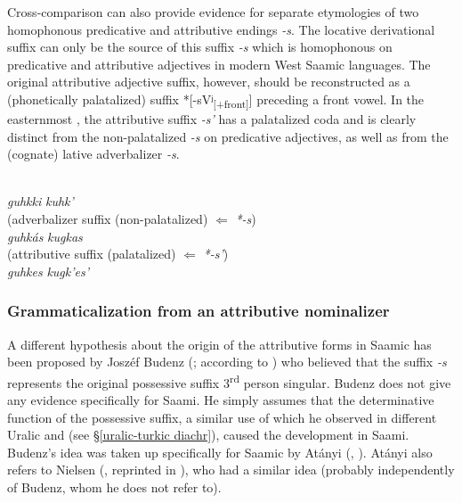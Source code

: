 {Cross-comparison can also provide evidence for separate etymologies of two homophonous predicative and attributive endings \textit{-s}. The locative derivational suffix can only be the source of this suffix \textit{-s} which is homophonous on predicative and attributive adjectives in modern West Saamic languages. The original attributive adjective suffix, however, should be reconstructed as a (phonetically palatalized) suffix *[-sVʲ\textsubscript{[+front]}] preceding a front vowel. In the easternmost , the attributive suffix \textit{-s'} has a palatalized coda and is clearly distinct from the non-palatalized \textit{-s} on predicative adjectives, as well as from the (cognate) lative adverbalizer \textit{-s}.
\begin{exe}
\settowidth{}
\ex 
\begin{xlist}
\\
	\textit{guhkki}	
	\textit{kuhk'}	
\\
	{\upshape (adverbalizer suffix (non-palatalized) $\Leftarrow$ \textit{*-s})}\\
	\textit{guhkás}	
	\textit{kugkas}	
\\
	{\upshape (attributive suffix (palatalized) $\Leftarrow$ \textit{*-s'})}\\
	\textit{guhkes}	
	\textit{kugk'es'}	
\end{xlist} 	
\end{exe}

\subsubsection{Grammaticalization from an attributive nominalizer}
A different hypothesis about the origin of the attributive forms in Saamic has been proposed by Joszéf Budenz (\citeyear{budenz1870}; according to \citealt{atanyi1942,atanyi1943}) who believed that the suffix \textit{-s} represents the original possessive suffix 3\textsuperscript{rd} person singular. Budenz does not give any evidence specifically for Saami. He simply assumes that the determinative function of the possessive suffix, a similar use of which he observed in different Uralic and  (see \S\ref{uralic-turkic diachr}), caused the development in Saami. Budenz's idea was taken up specifically for Saamic by Atányi (\citeyear{atanyi1942}, \citeyear{atanyi1943}). Atányi also refers to Nielsen (\citeyear{nielsen1933}, reprinted in \citealt{nielsen1945b}), who had a similar idea (probably independently of Budenz, whom he does not refer to).

}
